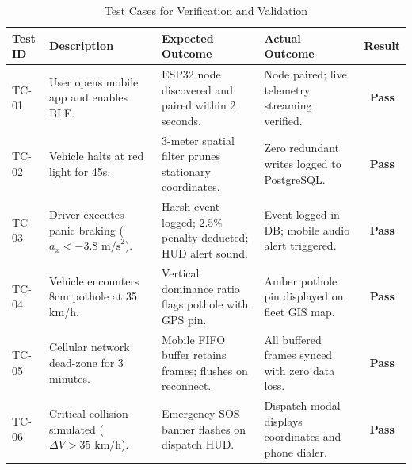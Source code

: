 \begin{table}[H]
\centering
\small
\caption{Test Cases for Verification and Validation}
\label{tab:test_cases}
\begin{tabularx}{\textwidth}{lp{3.5cm}p{4cm}p{4cm}c}
\toprule
\textbf{Test ID} & \textbf{Description} & \textbf{Expected Outcome} & \textbf{Actual Outcome} & \textbf{Result} \\
\midrule
TC-01 & User opens mobile app and enables BLE. & ESP32 node discovered and paired within 2 seconds. & Node paired; live telemetry streaming verified. & \textbf{Pass} \\
\addlinespace
TC-02 & Vehicle halts at red light for 45s. & 3-meter spatial filter prunes stationary coordinates. & Zero redundant writes logged to PostgreSQL. & \textbf{Pass} \\
\addlinespace
TC-03 & Driver executes panic braking ($a_x < -3.8\text{ m/s}^2$). & Harsh event logged; 2.5\% penalty deducted; HUD alert sound. & Event logged in DB; mobile audio alert triggered. & \textbf{Pass} \\
\addlinespace
TC-04 & Vehicle encounters 8cm pothole at 35 km/h. & Vertical dominance ratio flags pothole with GPS pin. & Amber pothole pin displayed on fleet GIS map. & \textbf{Pass} \\
\addlinespace
TC-05 & Cellular network dead-zone for 3 minutes. & Mobile FIFO buffer retains frames; flushes on reconnect. & All buffered frames synced with zero data loss. & \textbf{Pass} \\
\addlinespace
TC-06 & Critical collision simulated ($\Delta V > 35\text{ km/h}$). & Emergency SOS banner flashes on dispatch HUD. & Dispatch modal displays coordinates and phone dialer. & \textbf{Pass} \\
\bottomrule
\end{tabularx}
\end{table}
